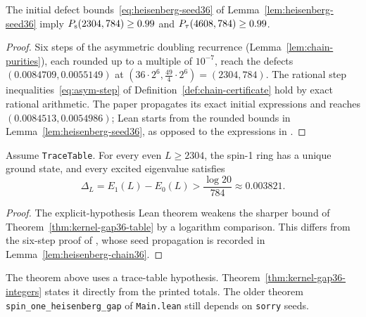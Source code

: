 \begin{lemma}[Six scale-doubling steps from \(L = 36\) to \(L = 2304\)]
  \label{lem:heisenberg-chain36}
  \leanok
  The initial defect bounds~\eqref{eq:heisenberg-seed36} of Lemma~\ref{lem:heisenberg-seed36} imply
  \(P_{\mathrm{s}}(2304, 784) \ge 0.99\) and \(P_{\tau}(4608, 784) \ge 0.99\).
\end{lemma}
\begin{proof}
  \leanok
  Six steps of the asymmetric doubling recurrence (Lemma~\ref{lem:chain-purities}), each rounded up
  to a multiple of \(10^{-7}\), reach the defects \((0.0084709, 0.0055149)\) at
  \((36 \cdot 2^6, \tfrac{49}{4} \cdot 2^6) = (2304, 784)\). The rational step
  inequalities~\eqref{eq:asym-step} of Definition~\ref{def:chain-certificate} hold by exact rational
  arithmetic. The paper propagates its exact initial expressions and reaches
  \((0.0084513,0.0054986)\); Lean starts from the rounded bounds in
  Lemma~\ref{lem:heisenberg-seed36}, as opposed to the expressions in
  \cite[Section 5.3]{OpenAIHaldane}.
\end{proof}

\begin{theorem}
  \label{thm:haldane-gap}
  \leanok
  Assume \texttt{TraceTable}. For every even \(L \ge 2304\), the spin-1 ring has a
  unique ground state, and every excited eigenvalue satisfies
  \begin{equation}
    \label{eq:haldane-gap}
    \Delta_L = E_1(L) - E_0(L) > \frac{\log 20}{784} \approx 0.003821.
  \end{equation}
\end{theorem}
\begin{proof}
  \leanok
  The explicit-hypothesis Lean theorem weakens the sharper bound of
  Theorem~\ref{thm:kernel-gap36-table} by a logarithm comparison.
  This differs from the six-step proof of \cite[Proposition 5.5 and equation (1.4)]{OpenAIHaldane},
  whose seed propagation is recorded in Lemma~\ref{lem:heisenberg-chain36}.
\end{proof}

\begin{remark}
  The theorem above uses a trace-table hypothesis. Theorem~\ref{thm:kernel-gap36-integers}
  states it directly from the printed totals. The older theorem
  \texttt{spin\_one\_heisenberg\_gap} of \texttt{Main.lean} still depends on \texttt{sorry} seeds.
\end{remark}


